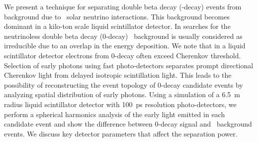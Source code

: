 We present a technique for separating double beta decay (\bb-decay) events from 
background due to \B~solar neutrino interactions. This background becomes dominant 
in a kilo-ton scale liquid scintillator detector. In searches for the neutrinoless 
double beta decay (0\nbb-decay) \B~background is usually considered as irreducible 
due to an overlap in the energy deposition. We note that in a liquid scintillator 
detector electrons from 0\nbb-decay often exceed Cherenkov threshold. Selection of 
early photons using fast photo-detectors separates prompt directional Cherenkov 
light from delayed isotropic scintillation light. This leads to the possibility of 
reconstructing the event topology of 0\nbb-decay candidate events by analyzing 
spatial distribution of early photons. Using a simulation of a 6.5~m radius liquid 
scintillator detector with 100~ps resolution photo-detectors, we perform a 
spherical harmonics analysis of the early light emitted in each candidate event and 
show the difference between 0\nbb-decay signal and \B~background events. We discuss 
key detector parameters that affect the separation power.


